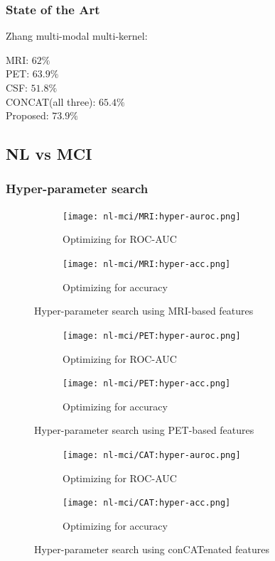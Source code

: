 \documentclass[12pt,a4paper]{article}
\begin{document}
\subsubsection{State of the Art}
\label{sec:mci-c-nc-soa}

Zhang multi-modal multi-kernel:

MRI: $62\%$\\
PET: $63.9\%$\\
CSF: $51.8\%$\\
CONCAT(all three): $65.4\%$\\
Proposed: $73.9\%$\\

\subsection{NL vs MCI}
\label{sec:nl-mci}

\subsubsection{Hyper-parameter search}
\label{sec:nl-mci-hyper}

\begin{figure}[H]
  \centering
  \begin{subfigure}[h]{0.49\textwidth}
    \texttt{[image: nl-mci/MRI:hyper-auroc.png]}
    \caption{Optimizing for ROC-AUC}  
  \end{subfigure}
  \begin{subfigure}[h]{0.49\textwidth}
    \texttt{[image: nl-mci/MRI:hyper-acc.png]}
    \caption{Optimizing for accuracy}  
  \end{subfigure}
  \caption{Hyper-parameter search using MRI-based features}
\end{figure}

\begin{figure}[H]
  \centering
  \begin{subfigure}[h]{0.49\textwidth}
    \texttt{[image: nl-mci/PET:hyper-auroc.png]}
    \caption{Optimizing for ROC-AUC}  
  \end{subfigure}
  \begin{subfigure}[h]{0.49\textwidth}
    \texttt{[image: nl-mci/PET:hyper-acc.png]}
    \caption{Optimizing for accuracy}  
  \end{subfigure}
  \caption{Hyper-parameter search using PET-based features}
\end{figure}

\begin{figure}[H]
  \centering
  \begin{subfigure}[h]{0.49\textwidth}
    \texttt{[image: nl-mci/CAT:hyper-auroc.png]}
    \caption{Optimizing for ROC-AUC}  
  \end{subfigure}
  \begin{subfigure}[h]{0.49\textwidth}
    \texttt{[image: nl-mci/CAT:hyper-acc.png]}
    \caption{Optimizing for accuracy}  
  \end{subfigure}
  \caption{Hyper-parameter search using conCATenated features}
\end{figure}
\end{document}
